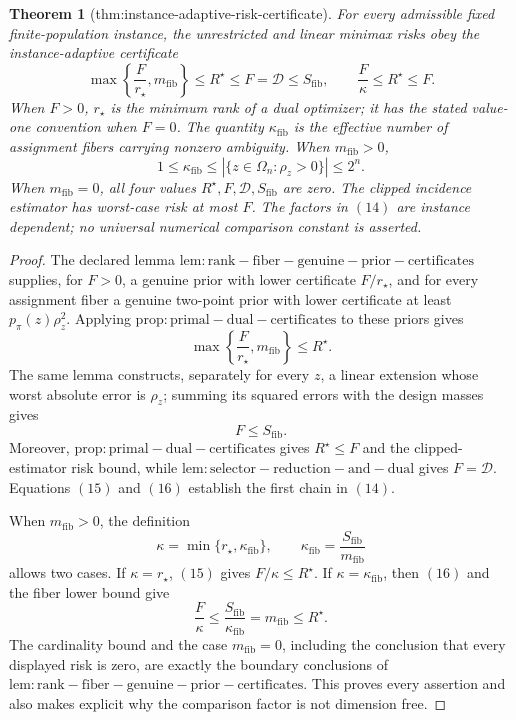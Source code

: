\documentclass{article}
\newtheorem{theorem}{Theorem}
\begin{document}
\begin{theorem}[thm:instance-adaptive-risk-certificate]\label{thm:instance-adaptive-risk-certificate}
For every admissible fixed finite-population instance, the unrestricted and linear minimax risks obey the instance-adaptive certificate
\[
 \max\left\{\frac{F}{r_{\star}},m_{\mathrm{fib}}\right\}
 \le R^{\star}\le F=\mathcal D\le S_{\mathrm{fib}},
 \qquad
 \frac{F}{\kappa}\le R^{\star}\le F.                                            \tag{14}
\]
When \(F>0\), \(r_{\star}\) is the minimum rank of a dual optimizer; it has the stated value-one convention when \(F=0\).  The quantity \(\kappa_{\mathrm{fib}}\) is the effective number of assignment fibers carrying nonzero ambiguity.  When \(m_{\mathrm{fib}}>0\),
\[
 1\le\kappa_{\mathrm{fib}}
 \le\left\lvert\{z\in\Omega_n:\rho_z>0\}\right\rvert
 \le2^n.
\]
When \(m_{\mathrm{fib}}=0\), all four values \(R^{\star},F,\mathcal D,S_{\mathrm{fib}}\) are zero.  The clipped incidence estimator has worst-case risk at most \(F\).  The factors in \((14)\) are instance dependent; no universal numerical comparison constant is asserted.
\end{theorem}
\begin{proof}
The declared lemma \(\mathrm{lem:rank-fiber-genuine-prior-certificates}\) supplies, for \(F>0\), a genuine prior with lower certificate \(F/r_{\star}\), and for every assignment fiber a genuine two-point prior with lower certificate at least \(p_\pi(z)\rho_z^2\).  Applying \(\mathrm{prop:primal-dual-certificates}\) to these priors gives
\[
 \max\left\{\frac{F}{r_{\star}},m_{\mathrm{fib}}\right\}\le R^{\star}.          \tag{15}
\]
The same lemma constructs, separately for every \(z\), a linear extension whose worst absolute error is \(\rho_z\); summing its squared errors with the design masses gives
\[
 F\le S_{\mathrm{fib}}.                                                           \tag{16}
\]
Moreover, \(\mathrm{prop:primal-dual-certificates}\) gives \(R^{\star}\le F\) and the clipped-estimator risk bound, while \(\mathrm{lem:selector-reduction-and-dual}\) gives \(F=\mathcal D\).  Equations \((15)\) and \((16)\) establish the first chain in \((14)\).

When \(m_{\mathrm{fib}}>0\), the definition
\[
 \kappa=\min\{r_{\star},\kappa_{\mathrm{fib}}\},
 \qquad
 \kappa_{\mathrm{fib}}=\frac{S_{\mathrm{fib}}}{m_{\mathrm{fib}}}
\]
allows two cases.  If \(\kappa=r_{\star}\), \((15)\) gives \(F/\kappa\le R^{\star}\).  If \(\kappa=\kappa_{\mathrm{fib}}\), then \((16)\) and the fiber lower bound give
\[
 \frac{F}{\kappa}
 \le\frac{S_{\mathrm{fib}}}{\kappa_{\mathrm{fib}}}
 =m_{\mathrm{fib}}
 \le R^{\star}.
\]
The cardinality bound and the case \(m_{\mathrm{fib}}=0\), including the conclusion that every displayed risk is zero, are exactly the boundary conclusions of \(\mathrm{lem:rank-fiber-genuine-prior-certificates}\).  This proves every assertion and also makes explicit why the comparison factor is not dimension free.
\end{proof}
\end{document}
